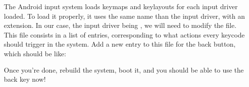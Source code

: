 The Android input system loads keymaps and keylayouts for each input
driver loaded. To load it properly, it uses the same name than the
input driver, with an extension. In our case, the input driver being
, we will need to modify the  file.\\

This file consists in a list of entries, corresponding to what actions
every keycode should trigger in the system. Add a new entry to this file
for the back button, which should be like:

Once you're done, rebuild the system, boot it, and you should be able
to use the back key now!
